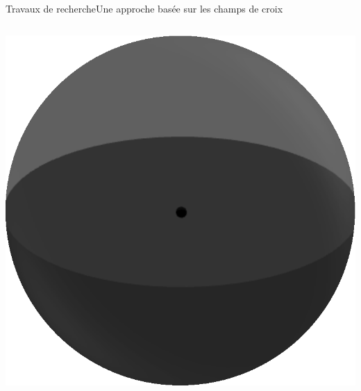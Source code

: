 \documentclass[compress,10pt,aspectratio=169]{beamer}
\begin{document}
\begin{frame}{Travaux de recherche}{Une approche basée sur les champs de croix}
\begin{columns}
\begin{column}{0.45\textwidth}
        \hspace{0.2cm}
        \includegraphics[scale=0.23]{images/sphere.eps}
        \vspace{0.3cm}
    \end{column}
\end{columns}
\end{frame}
\end{document}
